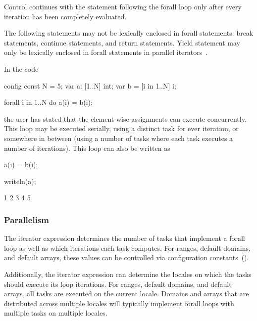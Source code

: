 Control continues with the statement following the forall loop only
after every iteration has been completely evaluated.

The following statements may not be lexically enclosed in forall
statements: break statements, continue statements, and return
statements.  Yield statement may only be lexically enclosed in forall
statements in parallel iterators~.

\begin{example}
In the code
\begin{chapelpre}
config const N = 5;
var a: [1..N] int;
var b = [i in 1..N] i;
\end{chapelpre}
\begin{chapel}
forall i in 1..N do
  a(i) = b(i);
\end{chapel}
the user has stated that the element-wise assignments can execute
concurrently.  This loop may be executed serially, using a distinct
task for ever iteration, or somewhere in between (using a number of
tasks where each task executes a number of iterations).  This loop can
also be written as
\begin{chapel}
[i in 1..N] a(i) = b(i);
\end{chapel}
\begin{chapelpost}
writeln(a);
\end{chapelpost}
\begin{chapeloutput}
1 2 3 4 5
\end{chapeloutput}
\end{example}

\subsubsection{Parallelism}
\label{forall_parallelism}

The iterator expression determines the number of tasks that implement
a forall loop as well as which iterations each task computes.  For
ranges, default domains, and default arrays, these values can be
controlled via configuration constants~().

Additionally, the iterator expression can determine the locales on
which the tasks should execute its loop iterations.  For ranges,
default domains, and default arrays, all tasks are executed on the
current locale.  Domains and arrays that are distributed across
multiple locales will typically implement forall loops with multiple
tasks on multiple locales.

